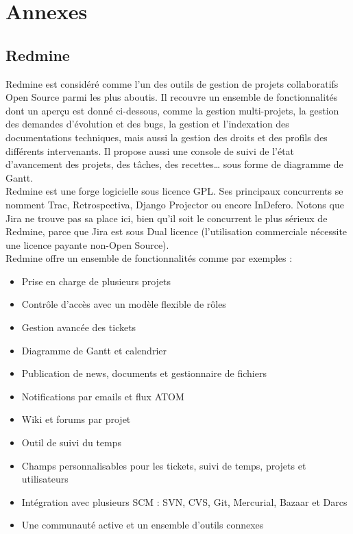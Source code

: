 \chapter{Annexes}
\label{Annexes}

\section{Redmine}\label{Annexe A}

Redmine est considéré comme l'un des outils de gestion de projets collaboratifs Open Source parmi les plus aboutis. Il recouvre un ensemble de fonctionnalités dont un aperçu est donné ci-dessous, comme la gestion multi-projets, la gestion des demandes d'évolution et des bugs, la gestion et l'indexation des documentations techniques, mais aussi la gestion des droits et des profils des différents intervenants. Il propose aussi une console de suivi de l'état d'avancement des projets, des tâches, des recettes… sous forme de diagramme de Gantt.\\

Redmine est une forge logicielle sous licence GPL. Ses principaux concurrents se nomment Trac, Retrospectiva, Django Projector ou encore InDefero. Notons que Jira ne trouve pas sa place ici, bien qu'il soit le concurrent le plus sérieux de Redmine, parce que Jira est sous Dual licence (l'utilisation commerciale nécessite une licence payante non-Open Source).\\

Redmine offre un ensemble de fonctionnalités comme par exemples :

\begin{itemize}
\item Prise en charge de plusieurs projets
\item Contrôle d'accès avec un modèle flexible de rôles
\item Gestion avancée des tickets
\item Diagramme de Gantt et calendrier
\item Publication de news, documents et gestionnaire de fichiers
\item Notifications par emails et flux ATOM
\item Wiki et forums par projet
\item Outil de suivi du temps
\item Champs personnalisables pour les tickets, suivi de temps, projets et utilisateurs
\item Intégration avec plusieurs SCM : SVN, CVS, Git, Mercurial, Bazaar et Darcs
\item Une communauté active et un ensemble d'outils connexes
\end{itemize}
\\

